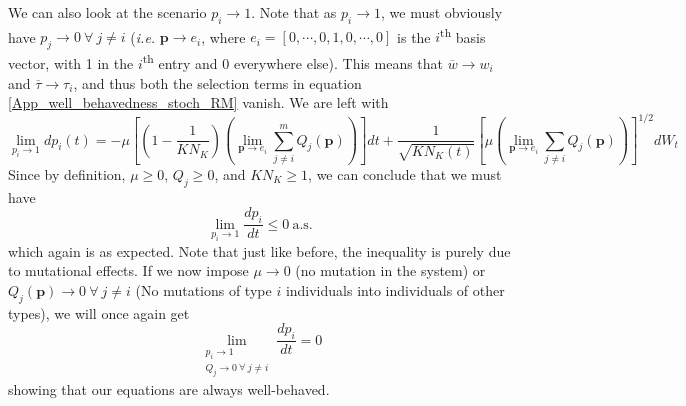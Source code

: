 We can also look at the scenario $p_i \to 1$. Note that as $p_i \to 1$, we must obviously have $p_j \to 0 \ \forall \ j \neq i$ (\emph{i.e.} $\mathbf{p} \to e_i$, where $e_i = [0,\cdots,0,1,0,\cdots,0]$ is the $i$\textsuperscript{th} basis vector, with 1 in the $i$\textsuperscript{th} entry and 0 everywhere else). This means that $\overline{w} \to w_i$ and $\overline{\tau} \to \tau_i$, and thus both the selection terms in equation \eqref{App_well_behavedness_stoch_RM} vanish. We are left with
\begin{equation*}
		\lim\limits_{p_i \to 1} dp_i(t) = -\mu\left[\left(1 - \frac{1}{KN_K}\right)\left(\lim\limits_{\mathbf{p} \to e_i}\sum\limits_{j\neq i}^{m}Q_j(\mathbf{p})\right)\right]dt
		+ \frac{1}{\sqrt{KN_{K}(t)}}\left[\mu\left(\lim\limits_{\mathbf{p} \to e_i} \sum\limits_{j\neq i}Q_j(\mathbf{p})\right)\right]^{1/2}dW_t
\end{equation*}
Since by definition, $\mu \geq 0$, $Q_j \geq 0$, and  $KN_K \geq 1$, we can conclude that we must have
\begin{equation*}
	\lim\limits_{p_i \to 1} \frac{dp_i}{dt} \leq 0 \ \textrm{a.s.}
\end{equation*}
which again is as expected. Note that just like before, the inequality is purely due to mutational effects. If we now impose $\mu \to 0$ (no mutation in the system) or $Q_j(\mathbf{p}) \to 0 \ \forall \ j \neq i$ (No mutations of type $i$ individuals into individuals of other types), we will once again get
\begin{equation*}
	\lim_{\substack{p_i \to 1 \\ Q_j \to 0 \ \forall \ j \neq i}} \frac{dp_i}{dt} = 0
\end{equation*}
showing that our equations are always well-behaved.